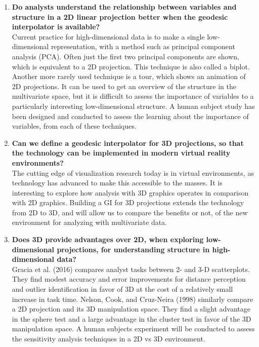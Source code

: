 \documentclass[11,]{article}
\begin{document}
\begin{enumerate}
\def\labelenumi{\arabic{enumi}.}
\setcounter{enumi}{1}
\item
  \textbf{Do analysts understand the relationship between variables and structure in a 2D linear projection better when the geodesic interpolator is available?}\\
  Current practice for high-dimensional data is to make a single low-dimensional representation, with a method such as principal component analysis (PCA). Often just the first two principal components are shown, which is equivalent to a 2D projection. This technique is also called a biplot. Another more rarely used technique is a tour, which shows an animation of 2D projections. It can be used to get an overview of the structure in the multivariate space, but it is difficult to assess the importance of variables to a particularly interesting low-dimensional structure. A human subject study has been designed and conducted to assess the learning about the importance of variables, from each of these techniques.
\item
  \textbf{Can we define a geodesic interpolator for 3D projections, so that the technology can be implemented in modern virtual reality environments?}\\
  The cutting edge of visualization research today is in virtual environments, as technology has advanced to make this accessible to the masses. It is interesting to explore how analysis with 3D graphics operates in comparison with 2D graphics. Building a GI for 3D projections extends the technology from 2D to 3D, and will allow us to compare the benefits or not, of the new environment for analyzing with multivariate data.
\item
  \textbf{Does 3D provide advantages over 2D, when exploring low-dimensional projections, for understanding structure in high-dimensional data? }\\
  Gracia et al. (2016) compares analyst tasks between 2- and 3-D scatterplots. They find modest accuracy and error improvements for distance perception and outlier identification in favor of 3D at the cost of a relatively small increase in task time. Nelson, Cook, and Cruz-Neira (1998) similarly compare a 2D projection and its 3D manipulation space. They find a slight advantage in the sphere test and a large advantage in the cluster test in favor of the 3D manipulation space. A human subjects experiment will be conducted to assess the sensitivity analysis techniques in a 2D vs 3D environment.
\end{enumerate}
\end{document}
